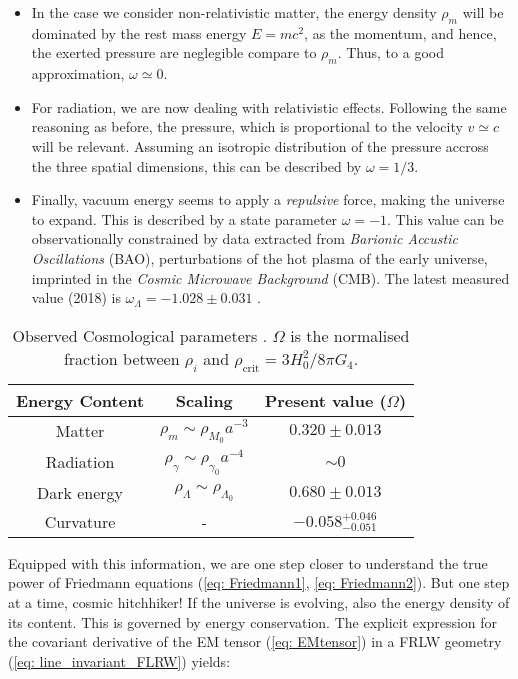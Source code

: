 \documentclass[11pt, a4paper]{article} %
\begin{document}
\begin{itemize}
	\item In the case we consider non-relativistic matter, the energy density $\rho_{m}$ will be dominated by the rest mass energy $E = mc^{2}$, as the momentum, and hence, the exerted pressure are neglegible compare to $\rho_{m}$. Thus, to a good approximation, $\omega \simeq 0$.
	\item For radiation, we are now dealing with relativistic effects. Following the same reasoning as before, the pressure, which is proportional to the velocity $v \simeq c$ will be relevant. Assuming an isotropic distribution of the pressure accross the three spatial dimensions, this can be described by $\omega = 1/3$.
	\item Finally, vacuum energy seems to apply a \textit{repulsive} force, making the universe to expand. This is described by a state parameter $\omega = - 1$. This value can be observationally constrained by data extracted from \textit{Barionic Accustic Oscillations} (BAO), perturbations of the hot plasma of the early universe, imprinted in the \textit{Cosmic Microwave Background} (CMB). The latest measured value (2018) is $\omega_{\Lambda} = -1.028 \pm 0.031$ \cite{2020planck}.
\end{itemize}
\vspace{0.5cm}
\begin{table}[h!]
	\centering
	\begin{tabular}{ccc}
	\toprule
	\textbf{Energy Content} & \textbf{Scaling} & \textbf{Present value ($\Omega$)} \\
	\midrule
	Matter & $\rho_{m} \sim \rho_{M_{0}} a^{-3}$ & $0.320 \pm 0.013$ \\
	Radiation & $\rho_{\gamma} \sim \rho_{\gamma_{0}} a^{-4}$ & $\sim 0$  \\
	Dark energy & $\rho_{\Lambda} \sim \rho_{\Lambda_{0}}$ & $0.680 \pm 0.013$ \\
	\hline
	Curvature & - & $-0.058^{+0.046}_{-0.051}$  \\
	\bottomrule
	\end{tabular}
	\caption{Observed Cosmological parameters \cite{2020planck}. $\Omega$ is the normalised fraction between $\rho_{i}$ and $\rho_{\text{crit}} = 3 H_{0}^{2}/8\pi G_{4}$.}
	\label{Table: energy_density}
\end{table}

Equipped with this information, we are one step closer to understand the true power of Friedmann equations (\ref{eq: Friedmann1}, \ref{eq: Friedmann2}). But one step at a time, cosmic hitchhiker! If the universe is evolving, also the energy density of its content. This is governed by energy conservation. The explicit expression for the covariant derivative of the EM tensor (\ref{eq: EMtensor}) in a FRLW geometry (\ref{eq: line_invariant_FLRW}) yields:
\end{document}
